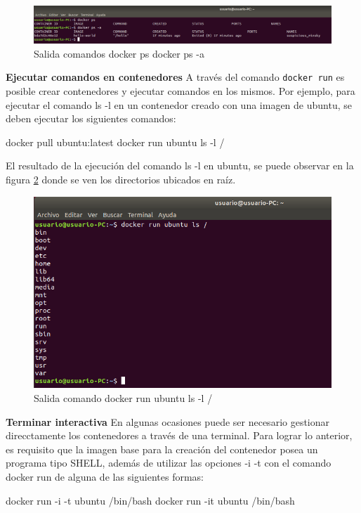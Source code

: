 \begin{figure}[!hbtp]
	\centering
	\includegraphics[width=\linewidth]{Trabajo/RecursosEducativos/RE05_Docker/Gestion_basica/REDocker_Gestion7.png}
	\vspace{-0.2cm}
	\caption{Salida comandos docker ps  docker ps -a}
	\label{fig:DockerGestion7}
\end{figure}
\textbf{Ejecutar comandos en contenedores}
A través del comando \texttt{docker run} es posible crear contenedores y ejecutar comandos en los mismos. Por ejemplo, para ejecutar el comando ls -l en un contenedor creado con una imagen de ubuntu, se deben ejecutar los siguientes comandos:
\begin{commandshell}
docker pull ubuntu:latest
docker run ubuntu ls -l /
\end{commandshell}

El resultado de la ejecución del comando ls -l en ubuntu, se puede observar en la figura \ref{fig:DockerGestion8} donde se ven los directorios ubicados en raíz.

\begin{figure}[!hbtp]
	\centering
	\includegraphics[width=\linewidth]{Trabajo/RecursosEducativos/RE05_Docker/Gestion_basica/REDocker_Gestion8.png}
	\vspace{-0.2cm}
	\caption{Salida comando docker run ubuntu ls -l /}
	\label{fig:DockerGestion8}
\end{figure}
\textbf{Terminar interactiva}
En algunas ocasiones puede ser necesario gestionar direcctamente los contenedores a través de una terminal. Para lograr lo anterior, es requisito que la imagen base para la creación del contenedor posea un programa tipo SHELL, además de utilizar las opciones -i -t con el comando docker run de alguna de las siguientes formas: 
\begin{commandshell}
docker run -i -t ubuntu /bin/bash
docker run -it ubuntu /bin/bash
\end{commandshell}

